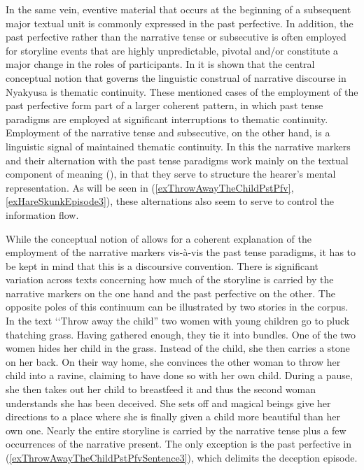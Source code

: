 In the same vein, eventive material that occurs at the beginning of a subsequent major textual unit is commonly expressed in the past perfective. In addition, the past perfective rather than the narrative tense or subsecutive is often employed for storyline events that are highly unpredictable, pivotal and/or constitute a major change in the roles of participants. In  it is shown that the central conceptual notion that governs the linguistic construal of narrative discourse in Nyakyusa is thematic continuity. These mentioned cases of the employment of the past perfective form part of a larger coherent pattern, in which past tense paradigms are employed at significant interruptions to thematic continuity. Employment of the narrative tense and subsecutive, on the other hand, is a linguistic signal of maintained thematic continuity. In this the narrative markers and their alternation with the past tense paradigms work mainly on the textual component of meaning (), in that they serve to structure the hearer's mental representation. As will be seen in (\ref{exThrowAwayTheChildPstPfv}, \ref{exHareSkunkEpisode3}), these alternations also seem to serve to control the information flow.

While the conceptual notion of  allows for a coherent explanation of the employment of the narrative markers vis-à-vis the past tense paradigms, it has to be kept in mind that this is a discoursive convention. There is significant variation across texts concerning how much of the storyline is carried by the narrative markers on the one hand and the past perfective on the other. The opposite poles of this continuum can be illustrated by two stories in the corpus. In the text \lq\lq Throw away the child'' two women with young children go to pluck thatching grass. Having gathered enough, they tie it into bundles. One of the two women hides her child in the grass. Instead of the child, she then carries a stone on her back. On their way home, she convinces the other woman to throw her child into a ravine, claiming to have done so with her own child. During a pause, she then takes out her child to breastfeed it and thus the second woman understands she has been deceived. She sets off and magical beings give her directions to a place where she is finally given a child more beautiful than her own one. Nearly the entire storyline is carried by the narrative tense plus a few occurrences of the narrative present. The only exception is the past perfective in (\ref{exThrowAwayTheChildPstPfvSentence3}), which delimits the deception episode.

